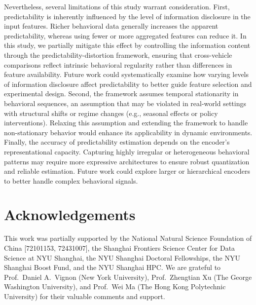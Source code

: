 \documentclass[12pt,review,authoryear]{elsarticle}
\theoremstyle{upright}
\begin{document}
Nevertheless, several limitations of this study warrant consideration. 
First, predictability is inherently influenced by the level of information disclosure in the input features. Richer behavioral data generally increases the apparent predictability, whereas using fewer or more aggregated features can reduce it. 
In this study, we partially mitigate this effect by controlling the information content through the predictability-distortion framework, ensuring that cross-vehicle comparisons reflect intrinsic behavioral regularity rather than differences in feature availability. Future work could systematically examine how varying levels of information disclosure affect predictability to better guide feature selection and experimental design.
Second, the framework assumes temporal stationarity in behavioral sequences, 
an assumption that may be violated in real-world settings with structural shifts 
or regime changes (e.g., seasonal effects or policy interventions). 
Relaxing this assumption and extending the framework to handle non-stationary behavior would enhance its applicability in dynamic environments. Finally, the accuracy of predictability estimation depends on the encoder’s 
representational capacity. Capturing highly irregular or heterogeneous behavioral patterns may require more expressive architectures to ensure robust quantization and reliable estimation. Future work could explore larger or hierarchical encoders to better handle complex behavioral signals.


\section*{Acknowledgements}
This work was partially supported by the National Natural Science Foundation of China [72101153, 72431007], the Shanghai Frontiers Science Center for Data Science at NYU Shanghai, the NYU Shanghai Doctoral Fellowships, the NYU Shanghai Boost Fund, and the NYU Shanghai HPC. 
We are grateful to Prof.\ Daniel A.\ Vignon (New York University), Prof.\ Zhengtian Xu (The George Washington University), and Prof.\ Wei Ma (The Hong Kong Polytechnic University) for their valuable comments and support.






\newpage
\appendix
\end{document}
